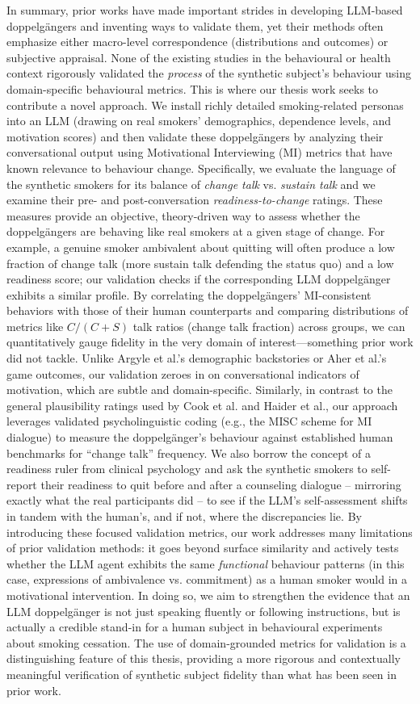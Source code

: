 In summary, prior works have made important strides in developing LLM-based doppelgängers and inventing ways to validate them, yet their methods often emphasize either macro-level correspondence (distributions and outcomes) or subjective appraisal. None of the existing studies in the behavioural or health context rigorously validated the \emph{process} of the synthetic subject’s behaviour using domain-specific behavioural metrics. This is where our thesis work seeks to contribute a novel approach. We install richly detailed smoking-related personas into an LLM (drawing on real smokers’ demographics, dependence levels, and motivation scores) and then validate these doppelgängers by analyzing their conversational output using Motivational Interviewing (MI) metrics that have known relevance to behaviour change. Specifically, we evaluate the language of the synthetic smokers for its balance of \textit{change talk} vs. \textit{sustain talk} and we examine their pre- and post-conversation \textit{readiness-to-change} ratings. These measures provide an objective, theory-driven way to assess whether the doppelgängers are behaving like real smokers at a given stage of change. For example, a genuine smoker ambivalent about quitting will often produce a low fraction of change talk (more sustain talk defending the status quo) and a low readiness score; our validation checks if the corresponding LLM doppelgänger exhibits a similar profile. By correlating the doppelgängers’ MI-consistent behaviors with those of their human counterparts and comparing distributions of metrics like $C/(C+S)$ talk ratios (change talk fraction) across groups, we can quantitatively gauge fidelity in the very domain of interest—something prior work did not tackle. Unlike Argyle et al.’s demographic backstories or Aher et al.’s game outcomes, our validation zeroes in on conversational indicators of motivation, which are subtle and domain-specific. Similarly, in contrast to the general plausibility ratings used by Cook et al. and Haider et al., our approach leverages validated psycholinguistic coding (e.g., the MISC scheme for MI dialogue) to measure the doppelgänger’s behaviour against established human benchmarks for “change talk” frequency. We also borrow the concept of a readiness ruler from clinical psychology and ask the synthetic smokers to self-report their readiness to quit before and after a counseling dialogue – mirroring exactly what the real participants did – to see if the LLM’s self-assessment shifts in tandem with the human’s, and if not, where the discrepancies lie. By introducing these focused validation metrics, our work addresses many limitations of prior validation methods: it goes beyond surface similarity and actively tests whether the LLM agent exhibits the same \emph{functional} behaviour patterns (in this case, expressions of ambivalence vs. commitment) as a human smoker would in a motivational intervention. In doing so, we aim to strengthen the evidence that an LLM doppelgänger is not just speaking fluently or following instructions, but is actually a credible stand-in for a human subject in behavioural experiments about smoking cessation. The use of domain-grounded metrics for validation is a distinguishing feature of this thesis, providing a more rigorous and contextually meaningful verification of synthetic subject fidelity than what has been seen in prior work.
